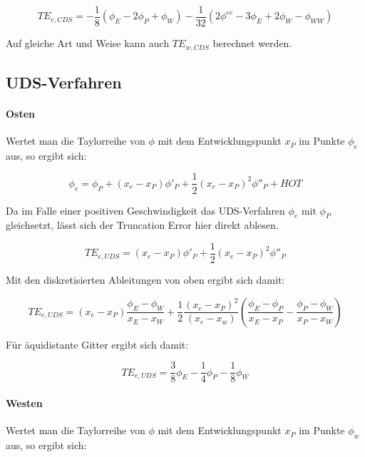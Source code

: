 \documentclass[11pt, ngerman,colorback,accentcolor=tud2d]{tudreport}
\begin{document}
\begin{equation*}
  TE_{e, CDS} = -\frac{1}{8} (\phi_E-2\phi_P+\phi_W) - \frac{1}{32}
  (2\phi^{ee} - 3\phi_E + 2\phi_W - \phi_{WW})
\end{equation*}

Auf gleiche Art und Weise kann auch $TE_{w, CDS}$ berechnet werden.

\subsection{UDS-Verfahren}

\paragraph{Osten}

Wertet man die Taylorreihe von $\phi$ mit dem Entwicklungspunkt $x_P$ im Punkte $\phi_e$
aus, so ergibt sich:

\begin{equation*}
  \phi_e = \phi_P +(x_e-x_P) \phi'_P + \frac{1}{2} (x_e-x_P)^2 \phi''_P+HOT
\end{equation*}

Da im Falle einer positiven Geschwindigkeit das UDS-Verfahren $\phi_e$ mit $\phi_P$
gleichsetzt, lässt sich der Truncation Error hier direkt ablesen.

\begin{equation*}
  TE_{e, UDS} = (x_e-x_P) \phi'_P + \frac{1}{2} (x_e-x_P)^2 \phi''_P
\end{equation*}

Mit den diskretisierten Ableitungen von oben ergibt sich damit:

\begin{equation}
  TE_{e, UDS} = (x_e-x_P) \frac{\phi_E-\phi_W}{x_E-x_W}+
  \frac{1}{2} \frac{(x_e-x_P)^2}{(x_e-x_w)} \left({\frac{\phi_E-\phi_P}{x_E-x_P}
  - \frac{\phi_P-\phi_W}{x_P-x_W} }\right)
\end{equation}

Für äquidistante Gitter ergibt sich damit:

\begin{equation}
  TE_{e, UDS} = \frac{3}{8} \phi_E-\frac{1}{4} \phi_P - \frac{1}{8} \phi_W
\end{equation}


\paragraph{Westen}

Wertet man die Taylorreihe von $\phi$ mit dem Entwicklungspunkt $x_P$ im Punkte $\phi_w$
aus, so ergibt sich:
\end{document}
